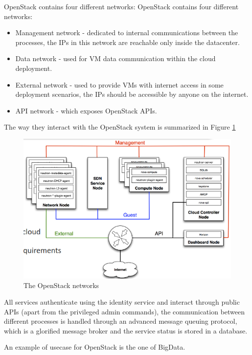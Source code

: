 OpenStack contains four different networks:
OpenStack contains four different networks:
\begin{itemize}
    \item Management network - dedicated to internal communications between the processes, the IPs
        in this network are reachable only inside the datacenter.
    \item Data network - used for VM data communication within the cloud deployment.
    \item External network - used to provide VMs with internet access in some deployment scenarios,
        the IPs should be accessible by anyone on the internet.
    \item API network - which exposes OpenStack APIs.
\end{itemize}
The way they interact with the OpenStack system is summarized in Figure \ref{fig:openstack-network}
\begin{figure}
    \centering
    \includegraphics[scale=0.5]{img/OpenStack_network.png}
    \caption{The OpenStack networks}
    \label{fig:openstack-network}
\end{figure}

All services authenticate using the identity service and interact through public APIs (apart from
the privileged admin commands), the communication between different processes is handled through an
advanced message queuing protocol, which is a glorified message broker and the service status is
stored in a database.

An example of usecase for OpenStack is the one of BigData.
